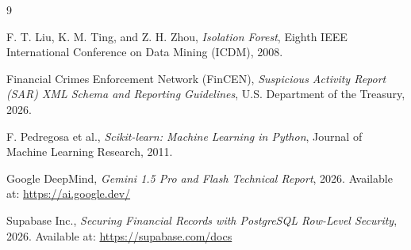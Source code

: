 \documentclass[12pt,a4paper]{report}
\begin{document}
\cleardoublepage
\begin{thebibliography}{9}

F. T. Liu, K. M. Ting, and Z. H. Zhou, \textit{Isolation Forest}, Eighth IEEE International Conference on Data Mining (ICDM), 2008.

Financial Crimes Enforcement Network (FinCEN), \textit{Suspicious Activity Report (SAR) XML Schema and Reporting Guidelines}, U.S. Department of the Treasury, 2026.

F. Pedregosa et al., \textit{Scikit-learn: Machine Learning in Python}, Journal of Machine Learning Research, 2011.

Google DeepMind, \textit{Gemini 1.5 Pro and Flash Technical Report}, 2026. Available at: \url{https://ai.google.dev/}

Supabase Inc., \textit{Securing Financial Records with PostgreSQL Row-Level Security}, 2026. Available at: \url{https://supabase.com/docs}

\end{thebibliography}
\end{document}
